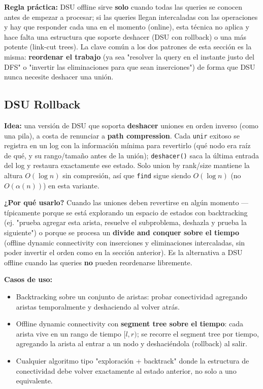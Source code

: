 \documentclass[10pt,a4paper,twocolumn]{article}
\begin{document}
\textbf{Regla práctica:} DSU offline sirve \textbf{solo} cuando todas
las queries se conocen antes de empezar a procesar; si las queries
llegan intercaladas con las operaciones y hay que responder cada una
en el momento (online), esta técnica no aplica y hace falta una
estructura que soporte deshacer (DSU con rollback) o una más potente
(link-cut trees). La clave común a los dos patrones de esta sección
es la misma: \textbf{reordenar el trabajo} (ya sea "resolver la query
en el instante justo del DFS" o "invertir las eliminaciones para que
sean inserciones") de forma que DSU nunca necesite deshacer una
unión.


\subsection{DSU Rollback}

\textbf{Idea:} una versión de DSU que soporta \textbf{deshacer}
uniones en orden inverso (como una pila), a costa de renunciar a
\textbf{path compression}. Cada \texttt{unir} exitoso se registra en
un log con la información mínima para revertirlo (qué nodo era raíz
de qué, y su rango/tamaño antes de la unión); \texttt{deshacer()}
saca la última entrada del log y restaura exactamente ese estado.
Solo union by rank/size mantiene la altura $O(\log n)$ sin
compresión, así que \texttt{find} sigue siendo $O(\log n)$ (no
$O(\alpha(n))$) en esta variante.

\textbf{¿Por qué usarlo?} Cuando las uniones deben revertirse en
algún momento —típicamente porque se está explorando un espacio de
estados con backtracking (ej. "prueba agregar esta arista, resuelve
el subproblema, deshazla y prueba la siguiente") o porque se procesa
un \textbf{divide and conquer sobre el tiempo} (offline dynamic
connectivity con inserciones y eliminaciones intercaladas, sin poder
invertir el orden como en la sección anterior). Es la alternativa a
DSU offline cuando las queries \textbf{no} pueden reordenarse
libremente.

\textbf{Casos de uso:}

\begin{itemize}
    \item Backtracking sobre un conjunto de aristas: probar
    conectividad agregando aristas temporalmente y deshaciendo al
    volver atrás.
    \item Offline dynamic connectivity con \textbf{segment tree sobre
    el tiempo}: cada arista vive en un rango de tiempo $[l, r)$; se
    recorre el segment tree por tiempo, agregando la arista al entrar
    a un nodo y deshaciéndola (rollback) al salir.
    \item Cualquier algoritmo tipo "exploración + backtrack" donde la
    estructura de conectividad debe volver exactamente al estado
    anterior, no solo a uno equivalente.
\end{itemize}
\end{document}
